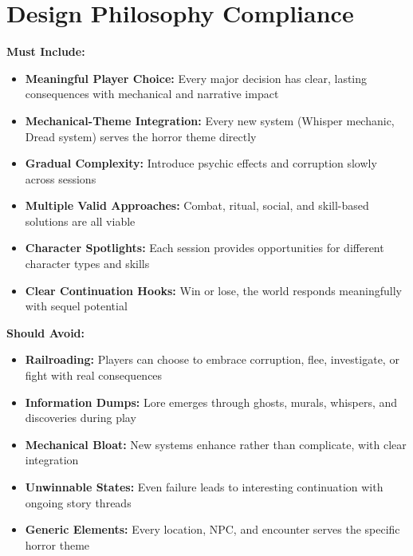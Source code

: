 \documentclass[11pt]{article}
\begin{document}
\section{Design Philosophy Compliance}

\textbf{Must Include:} \begin{itemize} \item \checkmark \textbf{Meaningful Player Choice:} Every major decision has clear, lasting consequences with mechanical and narrative impact \item \checkmark \textbf{Mechanical-Theme Integration:} Every new system (Whisper mechanic, Dread system) serves the horror theme directly \item \checkmark \textbf{Gradual Complexity:} Introduce psychic effects and corruption slowly across sessions \item \checkmark \textbf{Multiple Valid Approaches:} Combat, ritual, social, and skill-based solutions are all viable \item \checkmark \textbf{Character Spotlights:} Each session provides opportunities for different character types and skills \item \checkmark \textbf{Clear Continuation Hooks:} Win or lose, the world responds meaningfully with sequel potential \end{itemize}

\textbf{Should Avoid:} \begin{itemize} \item \checkmark \textbf{Railroading:} Players can choose to embrace corruption, flee, investigate, or fight with real consequences \item \checkmark \textbf{Information Dumps:} Lore emerges through ghosts, murals, whispers, and discoveries during play \item \checkmark \textbf{Mechanical Bloat:} New systems enhance rather than complicate, with clear integration \item \checkmark \textbf{Unwinnable States:} Even failure leads to interesting continuation with ongoing story threads \item \checkmark \textbf{Generic Elements:} Every location, NPC, and encounter serves the specific horror theme \end{itemize}
\end{document}
